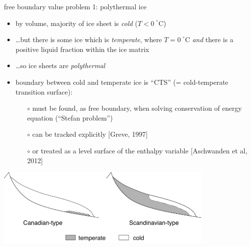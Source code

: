 \begin{frame}{free boundary value problem 1: polythermal ice}

\small
\begin{itemize}
\item by volume, majority of ice sheet is \emph{cold} ($T < 0\phantom{|}^\circ\text{C}$)
\item \dots but there is some ice which is \emph{temperate}, where $T = 0\phantom{|}^\circ\text{C}$ \emph{and} there is a positive liquid fraction within the ice matrix
\item \dots so ice sheets are \emph{polythermal}
\item boundary between cold and temperate ice is ``CTS'' (= cold-temperate transition surface):
  \begin{itemize}
  \item[$\circ$] must be found, as free boundary, when solving conservation of energy equation (``Stefan problem'')
  \item[$\circ$] can be tracked explicitly [Greve, 1997]
  \item[$\circ$] or treated as a level surface of the enthalpy variable [Aschwanden et al, 2012]
  \end{itemize}
\end{itemize}

\begin{center}
\includegraphics[width=0.8\textwidth]{photos/polythermal_types}
\end{center}
\end{frame}


